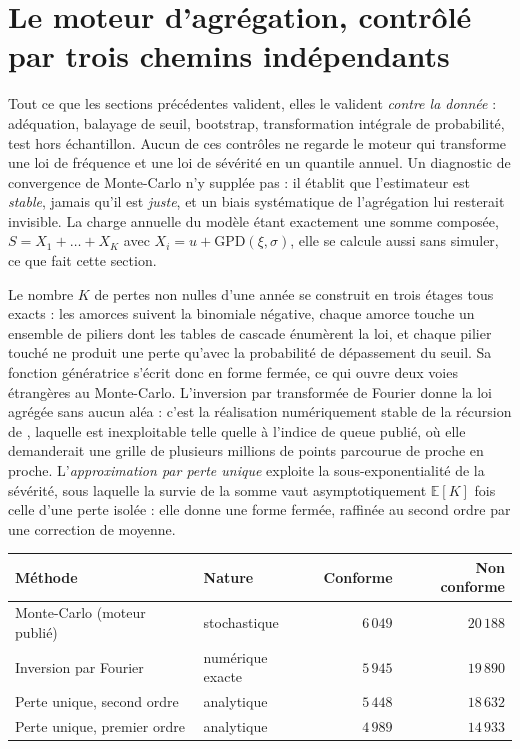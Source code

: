 \section{Le moteur d'agrégation, contrôlé par trois chemins indépendants}
\label{sec:triangulation-agregation}

Tout ce que les sections précédentes valident, elles le valident \emph{contre la donnée} :
adéquation, balayage de seuil, bootstrap, transformation intégrale de probabilité, test hors
échantillon. Aucun de ces contrôles ne regarde le moteur qui transforme une loi de fréquence et
une loi de sévérité en un quantile annuel. Un diagnostic de convergence de Monte-Carlo n'y
supplée pas : il établit que l'estimateur est \emph{stable}, jamais qu'il est \emph{juste}, et un
biais systématique de l'agrégation lui resterait invisible. La charge annuelle du modèle étant
exactement une somme composée, $S=X_1+\dots+X_K$ avec $X_i = u + \mathrm{GPD}(\xi,\sigma)$, elle
se calcule aussi sans simuler, ce que fait cette section.

Le nombre $K$ de pertes non nulles d'une année se construit en trois étages tous exacts : les
amorces suivent la binomiale négative, chaque amorce touche un ensemble de piliers dont les
tables de cascade énumèrent la loi, et chaque pilier touché ne produit une perte qu'avec la
probabilité de dépassement du seuil. Sa fonction génératrice s'écrit donc en forme fermée, ce qui
ouvre deux voies étrangères au Monte-Carlo. L'inversion par transformée de Fourier donne
la loi agrégée sans aucun aléa : c'est la réalisation numériquement stable de la récursion de
\citet{panjer1981} \citep{embrechtsfrei2009}, laquelle est inexploitable telle quelle à l'indice de
queue publié, où elle demanderait une grille de plusieurs millions de points parcourue de proche en
proche. L'\emph{approximation par perte unique} \citep{bockerkluppelberg2005} exploite la sous-exponentialité de la sévérité, sous laquelle la survie de la somme vaut
asymptotiquement $\mathbb{E}[K]$ fois celle d'une perte isolée : elle donne une forme fermée,
raffinée au second ordre par une correction de moyenne.

\begin{center}\footnotesize
\renewcommand{\arraystretch}{1.25}
\begin{tabular}{@{}l l r r@{}}
\toprule
\textbf{Méthode} & \textbf{Nature} & \textbf{Conforme} & \textbf{Non conforme} \\
\midrule
Monte-Carlo (moteur publié) & stochastique & $6\,049$ & $20\,188$ \\
Inversion par Fourier & numérique exacte & $5\,945$ & $19\,890$ \\
Perte unique, second ordre & analytique & $5\,448$ & $18\,632$ \\
Perte unique, premier ordre & analytique & $4\,989$ & $14\,933$ \\
\bottomrule
\end{tabular}
\end{center}

